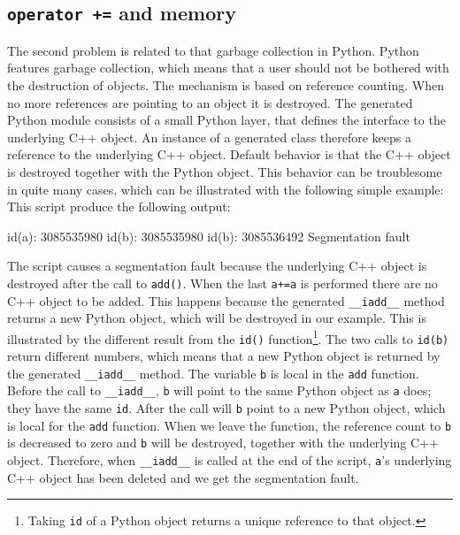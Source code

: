 \subsection{\texttt{operator +=} and memory}
The second problem is related to \swig that garbage collection in Python. Python features garbage collection, which means that a user should not be bothered with the destruction of objects. The mechanism is based on reference counting. When no more references are pointing to an object it is destroyed. The \swig generated Python module consists of a small Python layer, that defines the interface to the underlying C++ object. An instance of a \swig generated class therefore keeps a reference to the underlying C++ object. Default behavior is that the C++ object is destroyed together with the Python object. This behavior can be troublesome in quite many cases, which can be illustrated with the following simple example:
This script produce the following output:
\begin{code}
id(a): 3085535980
id(b): 3085535980
id(b): 3085536492
Segmentation fault
\end{code}
The script causes a segmentation fault because the underlying C++ object is destroyed after the call to \texttt{add()}. When the last \texttt{a+=a} is performed there are no C++ object to be added. This happens because the \swig generated \texttt{\_\_iadd\_\_} method returns a new Python object, which will be destroyed in our example. This is illustrated by the different result from the \texttt{id()} function\footnote{Taking \texttt{id} of a Python object returns a unique reference to that object.}. The two calls to \texttt{id(b)} return different numbers, which means that a new Python object is returned by the \swig generated \texttt{\_\_iadd\_\_} method. The variable \texttt{b} is local in the \texttt{add} function. Before the call to \texttt{\_\_iadd\_\_}, \texttt{b} will point to the same Python object as \texttt{a} does; they have the same \texttt{id}. After the call will \texttt{b} point to a new Python object, which is local for the \texttt{add} function. When we leave the function, the reference count to \texttt{b} is decreased to zero and \texttt{b} will be destroyed, together with the underlying C++ object. Therefore, when \texttt{\_\_iadd\_\_} is called at the end of the script, \texttt{a}'s underlying C++ object has been deleted  and we get the segmentation fault.\par

